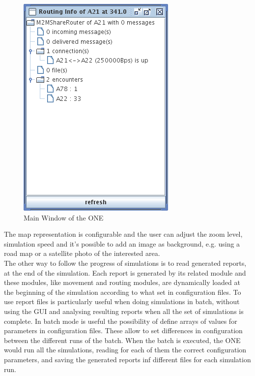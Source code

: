 \begin{figure}[htpb]
  \begin{center}
    \includegraphics[scale=0.6]{2-simulatore/img/Routing-Info.png}
    \caption[Routing Info]{Main Window of the ONE}    
    \label{Routing-Info}
  \end{center}
\end{figure}

The map representation is configurable and the user can adjust the zoom level, simulation speed and it's possible to add an image as background, e.g. using a road map or a satellite photo of the interested area.
\\

The other way to follow the progress of simulations is to read generated reports, at the end of the simulation. Each report is generated by its related module and these modules, like movement and routing modules, are dynamically loaded at the beginning of the simulation according to what set in configuration files. To use report files is particularly useful when doing simulations in batch, without using the GUI and analysing resulting reports when all the set of simulations is complete. In batch mode is useful the possibility of define arrays of values for parameters in configuration files. These allow to set differences in configuration between the different runs of the batch. When the batch is executed, the ONE would run all the simulations, reading for each of them the correct configuration parameters, and saving the generated reports inf different files for each simulation run.
\\

